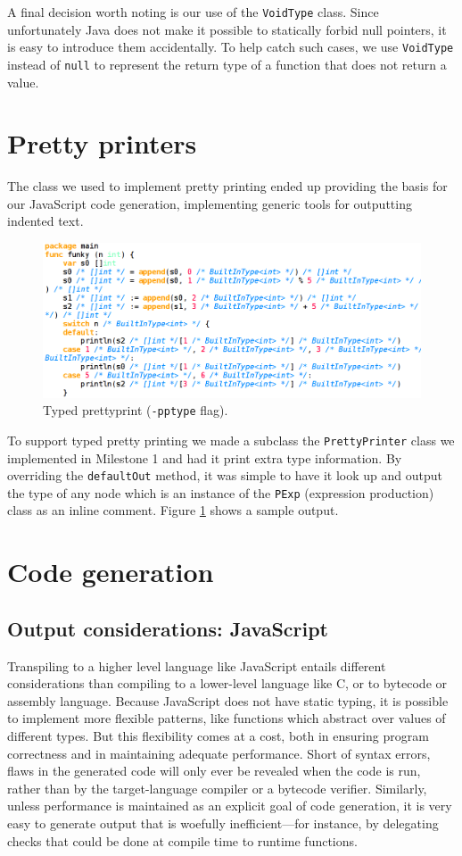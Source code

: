 \documentclass[oneside]{article}
\begin{document}
A final decision worth noting is our use of the \texttt{VoidType} class. Since unfortunately Java does not make it possible to statically forbid null pointers, it is easy to introduce them accidentally. To help catch such cases, we use \texttt{VoidType} instead of \texttt{null} to represent the return type of a function that does not return a value.

\section{Pretty printers}
The class we used to implement pretty printing ended up providing the basis for our JavaScript code generation, implementing generic tools for outputting indented text.

\begin{figure}
	\centering
    \includegraphics[width=\textwidth]{screen_pptype}
    \caption{Typed prettyprint (\texttt{-pptype} flag).}
    \label{fig:screen_pptype}
\end{figure}

To support typed pretty printing we made a subclass the \verb|PrettyPrinter| class we implemented in Milestone 1 and had it print extra type information. By overriding the \verb|defaultOut| method, it was simple to have it look up and output the type of any node which is an instance of the \verb|PExp| (expression production) class as an inline comment. Figure \ref{fig:screen_pptype} shows a sample output.

\section{Code generation}
\subsection{Output considerations: JavaScript}
Transpiling to a higher level language like JavaScript entails different considerations than compiling to a lower-level language like C, or to bytecode or assembly language. Because JavaScript does not have static typing, it is possible to implement more flexible patterns, like functions which abstract over values of different types. But this flexibility comes at a cost, both in ensuring program correctness and in maintaining adequate performance. Short of syntax errors, flaws in the generated code will only ever be revealed when the code is run, rather than by the target-language compiler or a bytecode verifier. Similarly, unless performance is maintained as an explicit goal of code generation, it is very easy to generate output that is woefully inefficient---for instance, by delegating checks that could be done at compile time to runtime functions.
\end{document}
